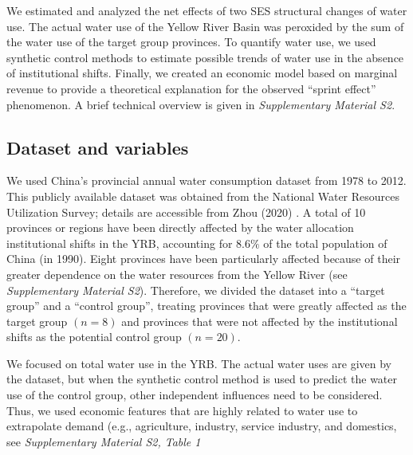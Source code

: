 
We estimated and analyzed the net effects of two SES structural changes of water use. The actual water use of the Yellow River Basin was peroxided by the sum of the water use of the target group provinces. To quantify water use, we used synthetic control methods to estimate possible trends of water use in the absence of institutional shifts. Finally, we created an economic model based on marginal revenue to provide a theoretical explanation for the observed “sprint effect” phenomenon. A brief technical overview is given in \textit{Supplementary Material S2}.

\subsection{Dataset and variables}
We used China’s provincial annual water consumption dataset from 1978 to 2012. This publicly available dataset was obtained from the National Water Resources Utilization Survey; details are accessible from Zhou (2020)
\cite{zhou2020}.
A total of 10 provinces or regions have been directly affected by the water allocation institutional shifts in the YRB, accounting for $8.6\%$ of the total population of China (in 1990). Eight provinces have been particularly affected because of their greater dependence on the water resources from the Yellow River (see \textit{Supplementary Material S2}). Therefore, we divided the dataset into a “target group” and a “control group”, treating provinces that were greatly affected as the target group $(n=8)$ and provinces that were not affected by the institutional shifts as the potential control group $(n=20)$.

We focused on total water use in the YRB. The actual water uses are given by the dataset, but when the synthetic control method is used to predict the water use of the control group, other independent influences need to be considered. Thus, we used economic features that are highly related to water use to extrapolate demand (e.g., agriculture, industry, service industry, and domestics, see \textit{Supplementary Material S2, Table 1}

